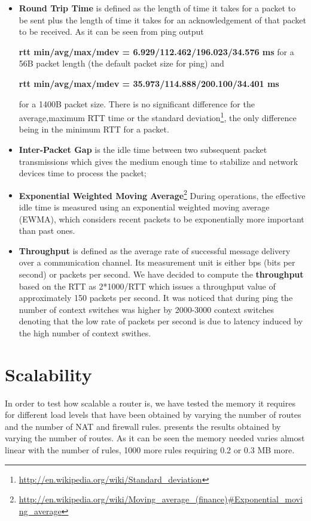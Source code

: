 \begin{itemize}
\item \textbf{Round Trip Time} is defined as the length of time it takes for a packet to be sent plus the length of time it takes for an acknowledgement of that packet to be received.
As it can be seen from ping output 

\textbf{rtt min/avg/max/mdev = 6.929/112.462/196.023/34.576 ms}
for a 56B packet length (the default packet size for ping) and 

\textbf{rtt min/avg/max/mdev = 35.973/114.888/200.100/34.401 ms}

for a 1400B packet size. There is no significant difference for the average,maximum RTT time or the standard deviation\footnote{\url{http://en.wikipedia.org/wiki/Standard_deviation}}, the only difference being in the minimum RTT for a packet.  
\item \textbf{Inter-Packet Gap} is the idle time between two subsequent packet transmissions which gives the medium enough time to stabilize and network devices time to process the packet;

\item \textbf{Exponential Weighted Moving Average}\footnote{\url{http://en.wikipedia.org/wiki/Moving_average_(finance)#Exponential_moving_average}} 
During operations, the effective idle time is measured using an exponential weighted moving average (EWMA), which considers 
recent packets to be exponentially more important than past ones. 

\item \textbf{Throughput} is defined as the average rate of successful message delivery over a 
communication channel. Its measurement unit is either bps (bits per second) or packets per second.
We have decided to compute the \textbf{throughput} based on the RTT as 2*1000/RTT which issues a throughput 
value of approximately 150 packets per second. It was noticed that during ping the number of context switches 
was higher by 2000-3000 context switches denoting that the low rate of packets per second is due to 
latency induced by the high number of context swithes. 
\end{itemize}
\section{Scalability}
\label{sec:scalability}

In order to test how scalable a router is, we have tested the memory it requires for different load levels that have been obtained 
by varying the number of routes and the number of NAT and firewall rules.
 presents the results obtained by varying the number of routes.
As it can be seen the memory needed varies almost linear with the number of rules, 1000 more rules requiring 0.2 or 0.3 MB more.

